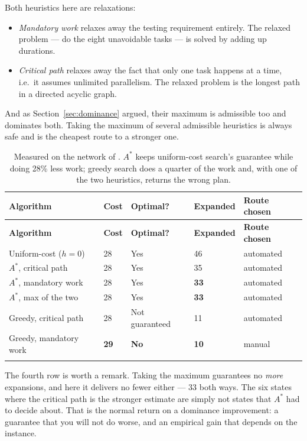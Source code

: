 Both heuristics here are relaxations:

\begin{itemize}[leftmargin=2.2em, itemsep=2pt, topsep=4pt]
  \item \emph{Mandatory work} relaxes away the testing requirement entirely. The
        relaxed problem --- do the eight unavoidable tasks --- is solved by adding
        up durations.
  \item \emph{Critical path} relaxes away the fact that only one task happens at a
        time, i.e.\ it assumes unlimited parallelism. The relaxed problem is the
        longest path in a directed acyclic graph.
\end{itemize}

And as Section~\ref{sec:dominance} argued, their maximum is admissible too and
dominates both. Taking the maximum of several admissible heuristics is always safe
and is the cheapest route to a stronger one.

\smallskip
\noindent\begin{longtable}{@{}L{3.9cm}L{1.5cm}L{2.1cm}L{1.9cm}L{3.9cm}@{}}
\toprule
\textbf{Algorithm} & \textbf{Cost} & \textbf{Optimal?} &
\textbf{Expanded} & \textbf{Route chosen} \\
\midrule
\endfirsthead
\toprule
\textbf{Algorithm} & \textbf{Cost} & \textbf{Optimal?} &
\textbf{Expanded} & \textbf{Route chosen} \\
\midrule
\endhead
Uniform-cost ($h=0$) & 28 & Yes & 46 & automated \\
$A^{*}$, critical path & 28 & Yes & 35 & automated \\
$A^{*}$, mandatory work & 28 & Yes & \textbf{33} & automated \\
$A^{*}$, max of the two & 28 & Yes & \textbf{33} & automated \\
Greedy, critical path & 28 & Not guaranteed & 11 & automated \\
Greedy, mandatory work & \textbf{29} & \textbf{No} & \textbf{10} & manual \\
\bottomrule
\caption{Measured on the network of . $A^{*}$ keeps
uniform-cost search's guarantee while doing 28\% less work; greedy search does a
quarter of the work and, with one of the two heuristics, returns the wrong plan.}
\label{tab:informed}
\end{longtable}

The fourth row is worth a remark. Taking the maximum guarantees no \emph{more}
expansions, and here it delivers no fewer either --- $33$ both ways. The six states
where the critical path is the stronger estimate are simply not states that $A^{*}$
had to decide about. That is the normal return on a dominance improvement: a
guarantee that you will not do worse, and an empirical gain that depends on the
instance.

